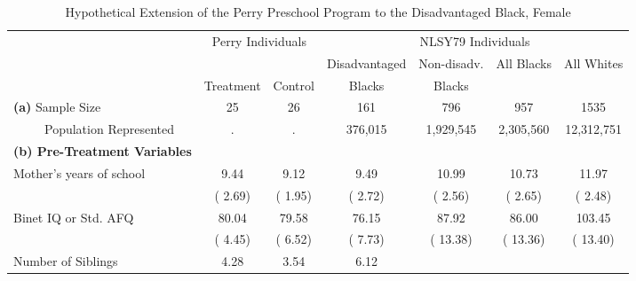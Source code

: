 \begin{table}[htbp]
\caption{\label{tab:tabfem_perry} Hypothetical Extension of the Perry Preschool Program to the Disadvantaged Black, Female}\medskip
\footnotesize  \begin{center} \begin{tabular}{lcccccccc}  \hline \hline    
&\multicolumn{2}{c}{Perry Individuals} &\multicolumn{6}{c}{NLSY79 Individuals}  \\[0.05cm]  \cline{2-3} \cline{5-9}   
 & \multicolumn{2}{c}{      }  & \multicolumn{2}{c}{Disadvantaged}  & \multicolumn{1}{c}{Non-disadv.}  & \multicolumn{2}{c}{All Blacks}  & \multicolumn{1}{c}{All Whites} \\  & \multicolumn{1}{c}{Treatment}  & \multicolumn{1}{c}{Control}  & \multicolumn{2}{c}{Blacks}  & \multicolumn{1}{c}{Blacks}  & \multicolumn{2}{c}{ } \\   \hline   
\textbf{(a)} Sample Size &25&           26& \multicolumn{2}{c}{          161} & \multicolumn{1}{c}{          796} &
\multicolumn{2}{c}{          957} &
\multicolumn{1}{c}{         1535} 
 \\[0.05cm] 
\ \ \ \ \ Population Represented &.&            .& \multicolumn{2}{c}{      376,015} & \multicolumn{1}{c}{    1,929,545} &
\multicolumn{2}{c}{    2,305,560} &
\multicolumn{1}{c}{   12,312,751} 
 \\[0.2cm] \hline
\textbf{(b) Pre-Treatment Variables}  \\[0.2cm] 
Mother's years of school &         9.44 &         9.12 & \multicolumn{2}{c}{         9.49} &
\multicolumn{1}{c}{        10.99} &
\multicolumn{2}{c}{        10.73} &
\multicolumn{1}{c}{        11.97} 
 \\[0.05cm]  
 & (        2.69) & (        1.95) & \multicolumn{2}{c}{(        2.72)} &
\multicolumn{1}{c}{(        2.56)} &
\multicolumn{2}{c}{(        2.65)} &
\multicolumn{1}{c}{(        2.48)} 
 \\[0.2cm]  
Binet IQ or Std. AFQ &        80.04 &        79.58 & \multicolumn{2}{c}{        76.15} &
\multicolumn{1}{c}{        87.92} &
\multicolumn{2}{c}{        86.00} &
\multicolumn{1}{c}{       103.45} 
 \\[0.05cm]  
 & (        4.45) & (        6.52) & \multicolumn{2}{c}{(        7.73)} &
\multicolumn{1}{c}{(       13.38)} &
\multicolumn{2}{c}{(       13.36)} &
\multicolumn{1}{c}{(       13.40)} 
 \\[0.2cm]  
Number of Siblings &         4.28 &         3.54 & \multicolumn{2}{c}{         6.12} &

\end{tabular}
\end{center}
\end{table}
